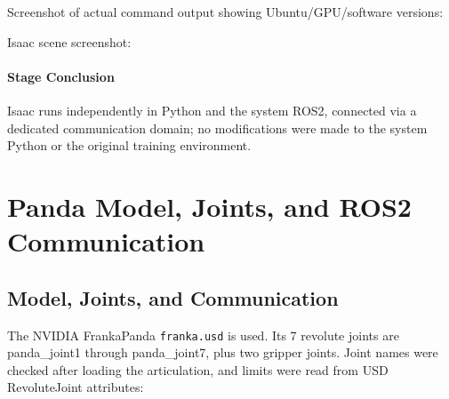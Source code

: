 Screenshot of actual command output showing Ubuntu/GPU/software versions:


Isaac scene screenshot:



\paragraph{Stage Conclusion} Isaac runs independently in Python and the system ROS2, connected via a dedicated communication domain; no modifications were made to the system Python or the original training environment.


\FloatBarrier

\section{Panda Model, Joints, and ROS2 Communication}

\label{stage:s02}

\subsection{Model, Joints, and Communication}\label{s02-detail-1}

The NVIDIA FrankaPanda \texttt{franka.usd} is used. Its 7 revolute joints are panda\_joint1 through panda\_joint7, plus two gripper joints. Joint names were checked after loading the articulation, and limits were read from USD RevoluteJoint attributes:

